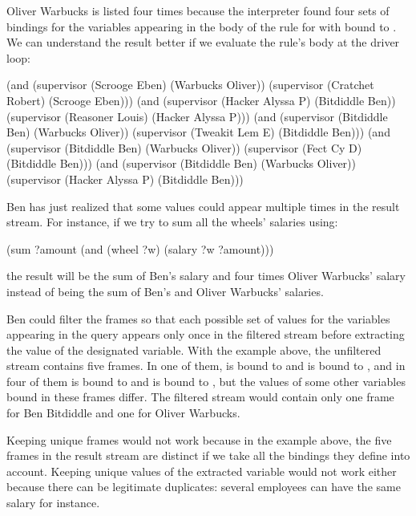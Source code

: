 \begin{exe}[4.65]
    Oliver Warbucks is listed four times because the interpreter found four sets 
    of bindings for the variables appearing in the body of the rule for 
     with  bound to . We can 
    understand the result better if we evaluate the rule’s body at the driver 
    loop:
    \begin{cscm}
        (and (supervisor (Scrooge Eben) (Warbucks Oliver))
             (supervisor (Cratchet Robert) (Scrooge Eben)))
        (and (supervisor (Hacker Alyssa P) (Bitdiddle Ben))
             (supervisor (Reasoner Louis) (Hacker Alyssa P)))
        (and (supervisor (Bitdiddle Ben) (Warbucks Oliver))
             (supervisor (Tweakit Lem E) (Bitdiddle Ben)))
        (and (supervisor (Bitdiddle Ben) (Warbucks Oliver))
             (supervisor (Fect Cy D) (Bitdiddle Ben)))
        (and (supervisor (Bitdiddle Ben) (Warbucks Oliver))
             (supervisor (Hacker Alyssa P) (Bitdiddle Ben)))
    \end{cscm}
\end{exe}

\begin{exe}[4.66]
    Ben has just realized that some values could appear multiple times in the 
    result stream. For instance, if we try to sum all the wheels’ salaries 
    using:
    \begin{cscm}
        (sum ?amount
             (and (wheel ?w)
                  (salary ?w ?amount)))
    \end{cscm}
    the result will be the sum of Ben’s salary and four times Oliver Warbucks’ 
    salary instead of being the sum of Ben’s and Oliver Warbucks’ salaries.

    Ben could filter the frames so that each possible set of values for the 
    variables appearing in the query appears only once in the filtered stream 
    before extracting the value of the designated variable. With the example 
    above, the unfiltered stream contains five frames. In one of them,  
    is bound to  and  is bound to 
    , and in four of them  is bound to
     and  is bound to , but 
    the values of some other variables bound in these frames differ. The 
    filtered stream would contain only one frame for Ben Bitdiddle and one for 
    Oliver Warbucks.

    Keeping unique frames would not work because in the example above, the five 
    frames in the result stream are distinct if we take all the bindings they 
    define into account. Keeping unique values of the extracted variable would 
    not work either because there can be legitimate duplicates: several 
    employees can have the same salary for instance.
\end{exe}
